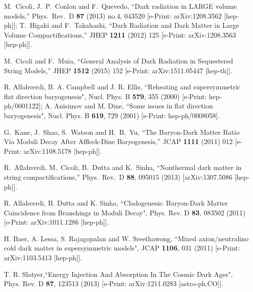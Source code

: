 \documentclass[11pt,a4paper]{article}
\begin{document}
\begin{thebibliography}{99}
  M.~Cicoli, J.~P.~Conlon and F.~Quevedo,
  ``Dark radiation in LARGE volume models,''
  Phys.\ Rev.\ D {\bf 87} (2013) no.4,  043520 [e-Print: arXiv:1208.3562 [hep-ph]];
T.~Higaki and F.~Takahashi,
  ``Dark Radiation and Dark Matter in Large Volume Compactifications,''
  JHEP {\bf 1211} (2012) 125 [e-Print: arXiv:1208.3563 [hep-ph]]. 

  M.~Cicoli and F.~Muia,
  ``General Analysis of Dark Radiation in Sequestered String Models,''
  JHEP {\bf 1512} (2015) 152 [e-Print: arXiv:1511.05447 [hep-th]].

R. Allahverdi, B. A. Campbell and J. R. Ellis, ``Reheating and supersymmetric flat direction baryogenesis", Nucl. Phys. B {\bf 579}, 355 (2000) [e-Print: hep-ph/0001122]; A. Anisimov and M. Dine, ``Some issues in flat direction baryogenesis", Nucl. Phys. B {\bf 619}, 729 (2001) [e-Print: hep-ph/0008058]. 
  
  G.~Kane, J.~Shao, S.~Watson and H.~B.~Yu,
  ``The Baryon-Dark Matter Ratio Via Moduli Decay After Affleck-Dine Baryogenesis,''
  JCAP {\bf 1111} (2011) 012  [e-Print: arXiv:1108.5178 [hep-ph]].

R.~Allahverdi, M.~Cicoli, B.~Dutta and K.~Sinha,
  ``Nonthermal dark matter in string compactifications,''
  Phys.\ Rev.\ D {\bf 88}, 095015 (2013)
  [arXiv:1307.5086 [hep-ph]].

R. Allahverdi, B. Dutta and K. Sinha, ``Cladogenesis: Baryon-Dark Matter Coincidence from Branchings in Moduli Decay", Phys. Rev. D {\bf 83}, 083502 (2011) [e-Print: arXiv:1011.1286 [hep-ph]].
	
H. Baer, A. Lessa, S. Rajagopalan and W. Sreethawong, ``Mixed axion/neutralino cold dark matter in supersymmetric models", JCAP {\bf 1106}, 031 (2011) [e-Print: arXiv:1103.5413 [hep-ph]].

T. R. Slatyer,``Energy Injection And Absorption In The Cosmic Dark Ages", Phys. Rev. D {\bf 87}, 123513 (2013) [e-Print: arXiv:1211.0283 [astro-ph.CO]]. 


\end{thebibliography}
\end{document}
